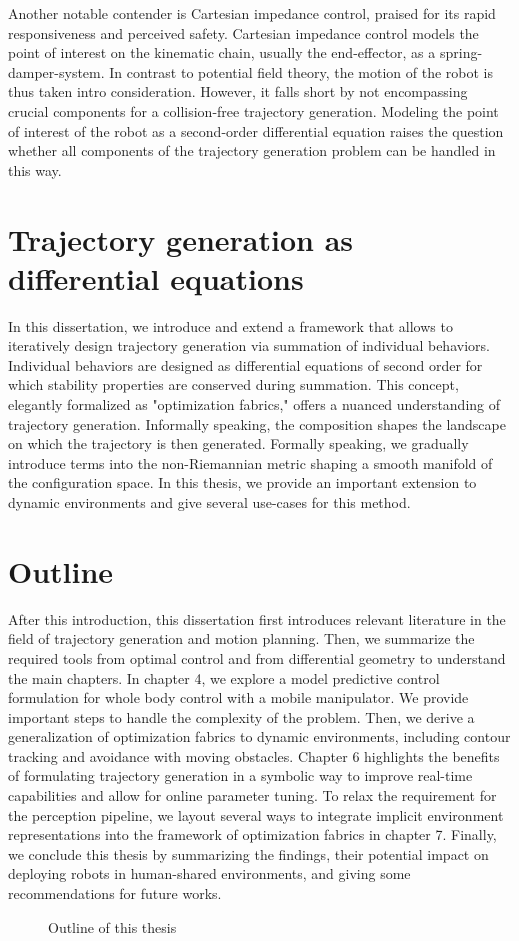Another notable contender is Cartesian impedance control,
praised for its rapid responsiveness and perceived safety.
Cartesian impedance control models the point of interest on
the kinematic chain, usually the end-effector, as a
spring-damper-system. In contrast to potential field theory,
the motion of the robot is thus taken intro consideration.
However, it falls short by not encompassing crucial
components for a collision-free trajectory generation.
Modeling the point of interest of the robot as a
second-order differential equation raises the question
whether all components of the trajectory generation problem
can be handled in this way. 

\section{Trajectory generation as differential equations}

In this dissertation, we introduce and extend a framework
that allows to iteratively design trajectory generation via
summation of individual behaviors. Individual behaviors are
designed as differential equations of second order for which
stability properties are conserved during summation.
This concept, elegantly formalized as "optimization
fabrics," offers a nuanced understanding of trajectory
generation. Informally speaking, the composition shapes the
landscape on which the trajectory is then generated.
Formally speaking, we gradually introduce terms into the
non-Riemannian metric shaping a smooth manifold of the
configuration space. In this thesis, we provide an important
extension to dynamic environments and give several use-cases
for this method.


\section{Outline}

After this introduction, this dissertation first introduces
relevant literature in the field of trajectory generation
and motion planning. Then, we summarize the required tools
from optimal control and from differential geometry to
understand the main chapters. In chapter 4, we explore a
model predictive control formulation for whole body control
with a mobile manipulator. We provide important steps to
handle the complexity of the problem. Then, we derive a
generalization of optimization fabrics to dynamic
environments, including contour tracking and avoidance with
moving obstacles. Chapter 6 highlights the benefits of
formulating trajectory generation in a symbolic way to
improve real-time capabilities and allow for online
parameter tuning. To relax the requirement for the
perception pipeline, we layout several ways to integrate
implicit environment representations into the framework of
optimization fabrics in chapter 7. Finally, we conclude this
thesis by summarizing the findings, their potential impact
on deploying robots in human-shared environments, and giving some
recommendations for future works.

\begin{figure}
  \begin{center}
    
  \end{center}
  \caption{Outline of this thesis}
  \label{fig:outline}
\end{figure}

